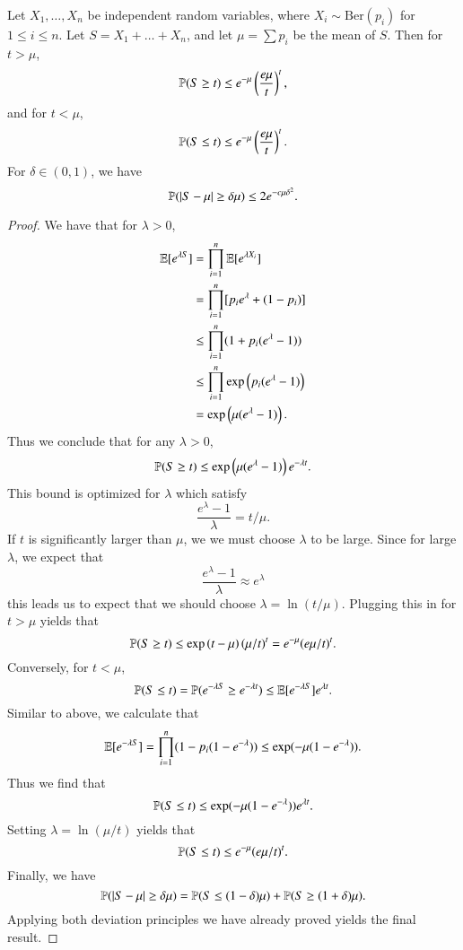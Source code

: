 \begin{lemma}
    Let $X_1,\dots,X_n$ be independent random variables, where $X_i \sim \text{Ber}(p_i)$ for $1 \leq i \leq n$. Let $S = X_1 + \dots + X_n$, and let $\mu = \sum p_i$ be the mean of $S$. Then for $t > \mu$,
    \[ \operatorname{\mathbb{P}}(S \geq t) \leq e^{-\mu} \left( \frac{e \mu}{t} \right)^t, \]
    and for $t < \mu$,
    \[ \operatorname{\mathbb{P}}(S \leq t) \leq e^{-\mu} \left( \frac{e \mu}{t} \right)^t.  \]
    For $\delta \in (0,1)$, we have
    \[ \operatorname{\mathbb{P}}(|S - \mu| \geq \delta \mu) \leq 2 e^{-c \mu \delta^2}. \]
\end{lemma}
\begin{proof}
    We have that for $\lambda > 0$,
    \begin{align*}
        \operatorname{\mathbb{E}}[ e^{\lambda S} ] &= \prod_{i = 1}^n \operatorname{\mathbb{E}} [ e^{\lambda X_i} ]\\
        &= \prod_{i = 1}^n [ p_i e^\lambda + (1 - p_i) ]\\
        &\leq \prod_{i = 1}^n (1 + p_i(e^\lambda - 1))\\
        &\leq \prod_{i = 1}^n \exp \left( p_i (e^\lambda - 1) \right)\\
        &= \exp \left( \mu (e^\lambda - 1) \right).
    \end{align*}
    Thus we conclude that for any $\lambda > 0$,
    \[ \operatorname{\mathbb{P}}( S \geq t ) \leq \exp \left( \mu (e^\lambda - 1) \right) e^{- \lambda t}. \]
    This bound is optimized for $\lambda$ which satisfy
    \[ \frac{e^\lambda - 1}{\lambda} = t / \mu. \]
    If $t$ is significantly larger than $\mu$, we we must choose $\lambda$ to be large. Since for large $\lambda$, we expect that
    \[ \frac{e^\lambda - 1}{\lambda} \approx e^\lambda \]
    this leads us to expect that we should choose $\lambda = \ln(t / \mu)$. Plugging this in for $t > \mu$ yields that
    \[ \operatorname{\mathbb{P}} ( S \geq t ) \leq \exp \left( t - \mu \right) (\mu/t)^{t} = e^{-\mu} (e \mu / t)^t. \]
    Conversely, for $t < \mu$,
    \[ \operatorname{\mathbb{P}}(S \leq t) = \operatorname{\mathbb{P}}(e^{-\lambda S} \geq e^{-\lambda t}) \leq \operatorname{\mathbb{E}}[e^{- \lambda S}] e^{\lambda t}. \]
    Similar to above, we calculate that
    \[ \operatorname{\mathbb{E}}[e^{-\lambda S}] = \prod_{i = 1}^n (1 - p_i (1 - e^{-\lambda}) ) \leq \exp( - \mu (1 - e^{-\lambda}) ).  \]
    Thus we find that
    \[ \operatorname{\mathbb{P}}(S \leq t) \leq \exp ( - \mu (1 - e^{-\lambda}) ) e^{\lambda t}. \]
    Setting $\lambda = \ln(\mu / t)$ yields that
    \[ \operatorname{\mathbb{P}}(S \leq t) \leq e^{-\mu} (e \mu / t)^t. \]
    Finally, we have
    \[ \operatorname{\mathbb{P}}(|S - \mu| \geq \delta \mu) = \operatorname{\mathbb{P}}(S \leq (1 - \delta) \mu) + \operatorname{\mathbb{P}}(S \geq (1 + \delta) \mu). \]
    Applying both deviation principles we have already proved yields the final result.
\end{proof}

